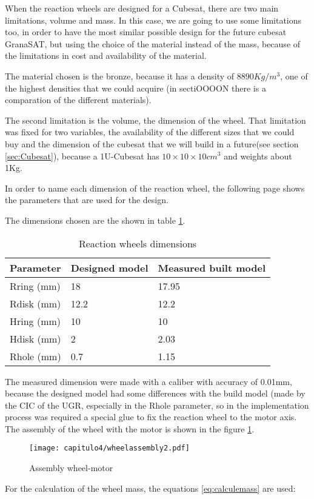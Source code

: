When the reaction wheels are designed for a Cubesat, there are two main limitations, volume and mass. In this case, we are going to use some limitations too, in order to have the most similar possible design for the future cubesat GranaSAT, but using the choice of the material instead of the mass, because of the limitations in cost and availability of the material.

The material chosen is the bronze, because it has a density of $8890 Kg/m^3$, one of the highest densities that we could acquire (in sectiOOOON there is a comparation of the different materials).

The second limitation is the volume, the dimension of the wheel. That limitation was fixed for two variables, the availability of the different sizes that we could buy and the dimension of the cubesat that we will build in a future(see section \ref{sec:Cubesat}), because a 1U-Cubesat has $10\times10\times10 cm^3$ and weights about 1Kg.

In order to name each dimension of the reaction wheel, the following page shows the parameters that are used for the design. 




The dimensions chosen are the shown in table \ref{tab:dimensionwheel}.

\begin{table}[H]
\centering
\begin{tabular}{|l|l|l|}
\hline\hline
\textbf{Parameter}		 & \textbf{Designed model}	& \textbf{Measured built model}\\ \hline
Rring (mm) 		& 18 & 17.95 \\ \hline
Rdisk (mm)    & 12.2  & 12.2      \\ \hline
Hring (mm)     & 10 & 10        \\ \hline
Hdisk (mm)     & 2 & 2.03    \\ \hline
Rhole (mm)     & 0.7 & 1.15    \\\hline\hline
\end{tabular}
\caption{Reaction wheels dimensions}\label{tab:dimensionwheel}
\end{table}
The measured dimension were made with a caliber with accuracy of 0.01mm, because the designed model had some differences with the build model (made by the \acrshort{CIC} of the \acrshort{UGR}, especially in the Rhole parameter, so in the implementation process was required a special glue to fix the reaction wheel to the motor axis. The assembly of the wheel with the motor is shown in the figure \ref{fig:wheelassembly}.
\begin{figure}[H]
	\centering
		\texttt{[image: capitulo4/wheelassembly2.pdf]}
	\caption{Assembly wheel-motor}
	\label{fig:wheelassembly}
\end{figure}
For the calculation of the wheel mass, the equations \ref{eq:calculemass} are used:

